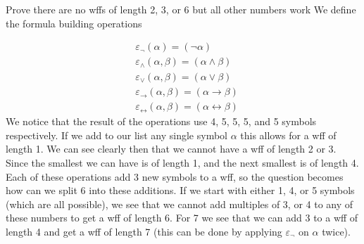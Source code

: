 
\def\name{Daniel Tobias}
\def\assignment{Introduction to Mathematical Logic}


\begin{problem}{1}{Prove there are no wffs of length 2, 3, or 6 but all other numbers work}
        We define the formula building operations

\begin{align}
    &\varepsilon_{\lnot}(\alpha) = (\lnot \alpha)\\
    &\varepsilon_{\land}(\alpha,\beta) = (\alpha \land \beta)\\
    &\varepsilon_{\lor}(\alpha, \beta) = (\alpha \lor \beta)\\
    &\varepsilon_{\rightarrow}(\alpha,\beta) = (\alpha \to \beta)\\
    &\varepsilon_{\leftrightarrow}(\alpha, \beta) = (\alpha \leftrightarrow \beta) 
\end{align}
We notice that the result of the operations use 4, 5, 5, 5, and 5 symbols respectively. If we add to our list any 
single symbol $\alpha$ this allows for a wff of length 1. We can see clearly then that we cannot have a wff of length 2 or 3. Since the smallest 
we can have is of length 1, and the next smallest is of length 4. Each of these operations add 3 new symbols to a wff, so the question becomes 
how can we split 6 into these additions. If we start with either 1, 4, or 5 symbols (which are all possible), we see that we cannot add multiples of 3, or 4
to any of these numbers to get a wff of length 6. For 7 we see that we can add 3 to a wff of length 4 and get a wff of length 7 (this
can be done by applying $\varepsilon_{\lnot}$ on $\alpha$ twice).
\end{problem}

